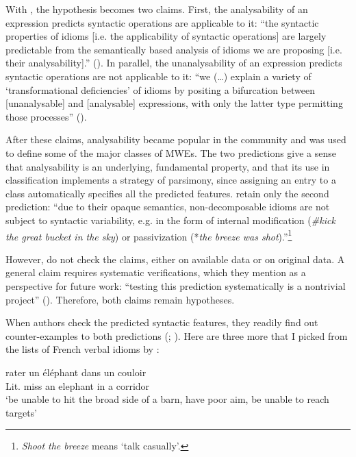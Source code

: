 \documentclass[output=paper]{langsci/langscibook}
\begin{document}
With \cite{Nunberg1994}, the hypothesis becomes two claims. First, the analysability of an expression predicts syntactic operations are applicable to it: “the syntactic properties of idioms [i.e. the applicability of syntactic operations] are largely predictable from the semantically based analysis of idioms we are proposing [i.e. their analysability].” (\citealt[507]{Nunberg1994}). In parallel, the unanalysability of an expression predicts syntactic operations are not applicable to it: “we (\ldots) explain a variety of ‘transformational deficiencies’ of idioms by positing a bifurcation between [unanalysable] and [analysable] expressions, with only the latter type permitting those processes” (\citealt[508]{Nunberg1994}).

After these claims, analysability became popular in the community and was used to define some of the major classes of MWEs. The two predictions give a sense that analysability is an underlying, fundamental property, and that its use in classification implements a strategy of parsimony, since assigning an entry to a class automatically specifies all the predicted features. \cite[4]{Sag:2002}  retain only the second prediction: “due to their opaque semantics, non-decomposable idioms are not subject to syntactic variability, e.g. in the form of internal modification (\textit{\#kick the great bucket in the sky}) or passivization (*\textit{the breeze was shot}).”\footnote{ \textit{Shoot the breeze} means ‘talk casually’.}

However, \cite{Nunberg1994}  do not check the claims, either on available data or on original data. A general claim requires systematic verifications, which they mention as a perspective for future work: “testing this prediction systematically is a nontrivial project” (\citealt[531]{Nunberg1994}). Therefore, both claims remain hypotheses.

When authors check the predicted syntactic features, they readily find out counter-examples to both predictions (\citealt{Abeille95}; \citealt{Stathi2007}). Here are three more that I picked from the lists of French verbal idioms by \citet{gross1982}:

\begin{exe}
\ex \label{58}
rater un éléphant dans un couloir\\
Lit. miss an elephant in a corridor\\
‘be unable to hit the broad side of a barn,  have poor aim,  be unable to reach targets’
\end{exe}
\end{document}

